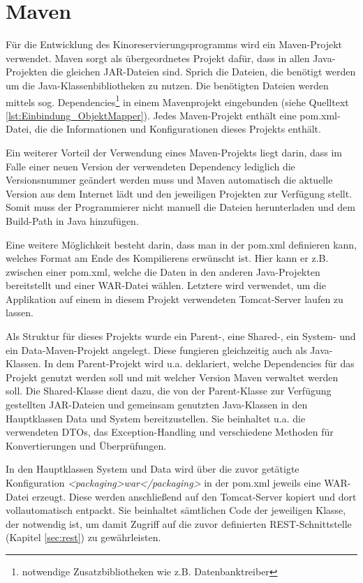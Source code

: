 \section{Maven}
\label{sec:maven}

Für die Entwicklung des Kinoreservierungsprogramms wird ein Maven-Projekt verwendet.
Maven sorgt als übergeordnetes Projekt dafür, dass in allen Java-Projekten die gleichen JAR-Dateien sind.
Sprich die Dateien, die benötigt werden um die Java-Klassenbibliotheken zu nutzen.
Die benötigten Dateien werden mittels sog. Dependencies\footnote{notwendige Zusatzbibliotheken wie z.B. Datenbanktreiber} in einem Mavenprojekt eingebunden (siehe Quelltext \vref{lst:Einbindung_ObjektMapper}).
Jedes Maven-Projekt enthält eine pom.xml-Datei, die die Informationen und Konfigurationen dieses Projekts enthält.

Ein weiterer Vorteil der Verwendung eines Maven-Projekts liegt darin, dass im Falle einer neuen Version der verwendeten Dependency lediglich die Versionsnummer geändert werden muss und Maven automatisch die aktuelle Version aus dem Internet lädt und den jeweiligen Projekten zur Verfügung stellt.
Somit muss der Programmierer nicht manuell die Dateien herunterladen und dem Build-Path in Java hinzufügen.

Eine weitere Möglichkeit besteht darin, dass man in der pom.xml definieren kann, welches Format am Ende des Kompilierens erwünscht ist.
Hier kann er z.B. zwischen einer pom.xml, welche die Daten in den anderen Java-Projekten bereitstellt und einer WAR-Datei wählen.
Letztere wird verwendet, um die Applikation auf einem in diesem Projekt verwendeten Tomcat-Server laufen zu lassen.

Als Struktur für dieses Projekts wurde ein Parent-, eine Shared-, ein System- und ein Data-Maven-Projekt angelegt.
Diese fungieren gleichzeitig auch als Java-Klassen.
In dem Parent-Projekt wird u.a. deklariert, welche Dependencies für das Projekt genutzt werden soll und mit welcher Version Maven verwaltet werden soll.
Die Shared-Klasse dient dazu, die von der Parent-Klasse zur Verfügung gestellten JAR-Dateien und gemeinsam genutzten Java-Klassen in den Hauptklassen Data und System bereitzustellen.
Sie beinhaltet u.a. die verwendeten \acp{DTO}, das Exception-Handling und verschiedene Methoden für Konvertierungen und Überprüfungen.

In den Hauptklassen System und Data wird über die zuvor getätigte Konfiguration \emph{<packaging>war</packaging>} in der pom.xml jeweils eine WAR-Datei erzeugt.
Diese werden anschließend auf den Tomcat-Server kopiert und dort vollautomatisch entpackt.
Sie beinhaltet sämtlichen Code der jeweiligen Klasse, der notwendig ist, um damit Zugriff auf die zuvor definierten \acs{REST}-Schnittstelle (Kapitel \vref{sec:rest}) zu gewährleisten.